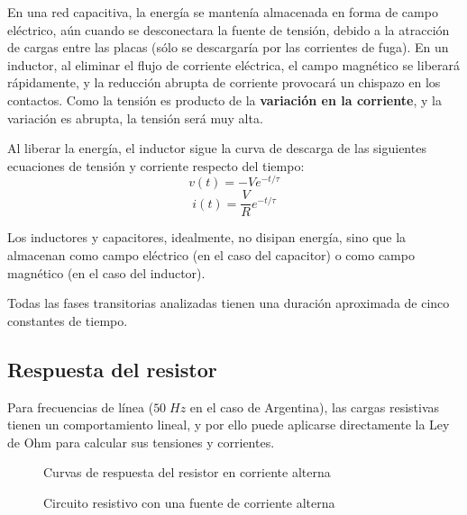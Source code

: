 En una red capacitiva, la energía se mantenía almacenada en forma de campo eléctrico, aún cuando se desconectara la fuente de tensión, debido a la atracción de cargas entre las placas (sólo se descargaría por las corrientes de fuga). En un inductor, al eliminar el flujo de corriente eléctrica, el campo magnético se liberará rápidamente, y la reducción abrupta de corriente provocará un chispazo en los contactos. Como la tensión es producto de la \textbf{variación en la corriente}, y la variación es abrupta, la tensión será muy alta.

Al liberar la energía, el inductor sigue la curva de descarga de las siguientes ecuaciones de tensión y corriente respecto del tiempo:
\begin{equation}
	\label{eq:liberacion_inductor_v}
	v(t)=-Ve^{-t / \tau}
\end{equation}
\begin{equation}
	\label{eq:liberacion_inductor_v}
	i(t)=\frac{V}{R} e^{-t / \tau}
\end{equation}

\begin{conclusiones}
	Los inductores y capacitores, idealmente, no disipan energía, sino que la almacenan como campo eléctrico (en el caso del capacitor) o como campo magnético (en el caso del inductor).
	
	Todas las fases transitorias analizadas tienen una duración aproximada de cinco constantes de tiempo.
\end{conclusiones}

\subsection{Respuesta del resistor}

Para frecuencias de línea ($50\; Hz$ en el caso de Argentina), las cargas resistivas tienen un comportamiento lineal, y por ello puede aplicarse directamente la Ley de Ohm para calcular sus tensiones y corrientes.

\begin{figure}[htbp]
  \caption{Curvas de respuesta del resistor en corriente alterna}
  \label{fig:respuesta_resistor_curvas}
\end{figure}
\begin{figure}[htbp]
  \caption{Circuito resistivo con una fuente de corriente alterna}
  \label{fig:respuesta_resistor_circuito}
\end{figure}

